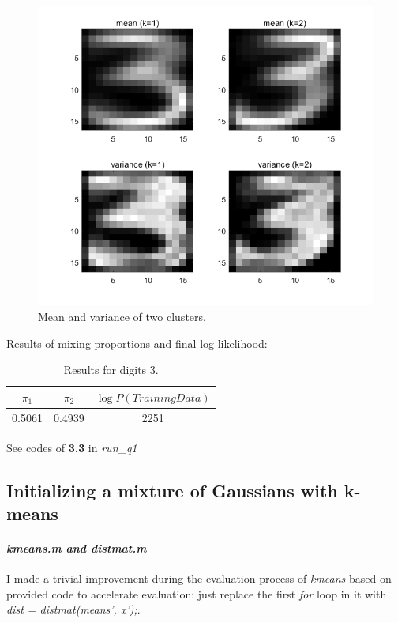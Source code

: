 \documentclass{article}
\begin{document}
\begin{figure}[H]
	\centering
	\includegraphics[scale=0.6]{figure20}
	\caption{Mean and variance of two clusters.}
	\label{fig20}
\end{figure}

Results of mixing proportions and final log-likelihood:
\begin{table}[H]
	\centering
	\caption{Results for digits 3.}
	\label{tab6}
	\begin{tabular}{ccc}
	\toprule
	$\pi_1$ & $\pi_2$ & $\log P(TrainingData)$\\
	\midrule
	0.5061 & 0.4939 & 2251\\
	\bottomrule
	\end{tabular}
\end{table}
See codes of \textbf{3.3} in \textit{run\_q1}

\subsection{Initializing a mixture of Gaussians with k-means}
\paragraph{\textit{kmeans.m and distmat.m}}
I made a trivial improvement during the evaluation process of \textit{kmeans} based on provided code to accelerate evaluation: just replace the first \textit{for} loop in it with \textit{dist = distmat(means', x');}.
\end{document}
